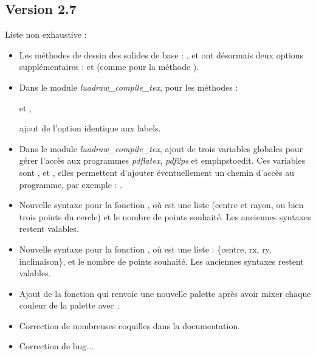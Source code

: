 \subsection{Version 2.7}
Liste non exhaustive :
\begin{itemize}
    \item Les méthodes de dessin des solides de base : ,  et  ont désormais deux options supplémentaires :  et  (comme pour la méthode ).
    
    \item Dans le module \emph{luadraw\_compile\_tex}, pour les méthodes : \par
    \hfil {} et ,\hfil\par
     ajout de l'option  identique aux labels.
     
    \item Dans le module \emph{luadraw\_compile\_tex}, ajout de trois variables globales pour gérer l'accès aux programmes \emph{pdflatex}, \emph{pdf2ps} et emph{pstoedit}. Ces variables sont ,  et , elles permettent d'ajouter éventuellement un chemin d'accès au programme, par exemple : .
    
    \item Nouvelle syntaxe pour la fonction , où  est une liste (centre et rayon, ou bien trois points du cercle) et  le nombre de points souhaité. Les anciennes syntaxes restent valables.
    \item Nouvelle syntaxe pour la fonction , où  est une liste : \{centre, rx, ry, inclinaison\}, et  le nombre de points souhaité. Les anciennes syntaxes restent valables.
    
    \item Ajout de la fonction  qui renvoie une nouvelle palette après avoir mixer chaque couleur de la palette  avec .
    
    \item Correction de nombreuses coquilles dans la documentation.
    
    \item Correction de bug...
\end{itemize}

